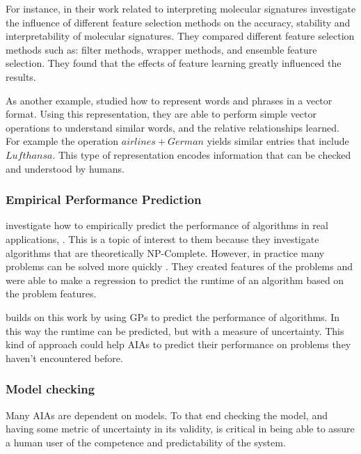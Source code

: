     For instance, in their work related to interpreting molecular signatures \citet{Haury2011-zi} investigate the influence of different feature selection methods on the accuracy, stability and interpretability of molecular signatures. They compared different feature selection methods such as: filter methods, wrapper methods, and ensemble feature selection. They found that the effects of feature learning greatly influenced the results. 

    As another example, \citet{Mikolov2013-lt} studied how to represent words and phrases in a vector format. Using this representation, they are able to perform simple vector operations to understand similar words, and the relative relationships learned. For example the operation $airlines+German$ yields similar entries that include $Lufthansa$. This type of representation encodes information that can be checked and understood by humans. 
    

\subsubsection{Empirical Performance Prediction}
    \citet{Leyton-Brown2009-yr} investigate how to empirically predict the performance of algorithms in real applications, . This is a topic of interest to them because they investigate algorithms that are theoretically NP-Complete. However, in practice many problems can be solved more quickly . They created features of the problems and were able to make a regression to predict the runtime of an algorithm based on the problem features. 

\citet{Hutter2006-ak} builds on this work by using GPs to predict the performance of algorithms. In this way the runtime can be predicted, but with a measure of uncertainty.  This kind of approach could help AIAs to predict their performance on problems they haven't encountered before. 

\subsubsection{Model checking} 
Many AIAs are dependent on models. To that end checking the model, and having some metric of uncertainty in its validity, is critical in being able to assure a human user of the competence and predictability of the system.
    
